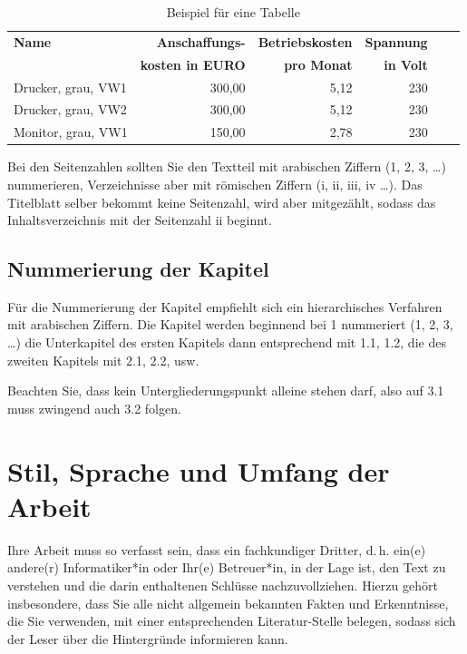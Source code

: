 \documentclass[a4paper,11pt,headings=normal]{scrartcl}
\begin{document}
\begin{table}
\caption{Beispiel für eine Tabelle}
\label{tabellenbeispiel}
\footnotesize
\centering
\begin{tabular}{l r r r r r}
\toprule
\textbf{Name} & \textbf{Anschaffungs-} & \textbf{Betriebskosten} & \textbf{Spannung}  \\
& \textbf{kosten in EURO} & \textbf{pro Monat} & \textbf{in Volt} \\
\midrule
Drucker, grau, VW1 &    300,00 &   5,12 & 230  \\
Drucker, grau, VW2 &    300,00 &   5,12 & 230  \\
Monitor, grau, VW1 &    150,00 &   2,78 & 230  \\
\bottomrule
\end{tabular}
\end{table}

Bei den Seitenzahlen sollten Sie den Textteil mit arabischen Ziffern (1, 2, 3, \dots) nummerieren, Verzeichnisse aber mit römischen Ziffern (i, ii, iii, iv \dots). Das Titelblatt selber bekommt keine Seitenzahl, wird aber mitgezählt, sodass das Inhaltsverzeichnis mit der Seitenzahl ii beginnt.

\subsection{Nummerierung der Kapitel}
Für die Nummerierung der Kapitel empfiehlt sich ein hierarchisches Verfahren mit arabischen Ziffern. Die Kapitel werden beginnend bei 1 nummeriert (1, 2, 3, \dots) die Unterkapitel des ersten Kapitels dann entsprechend mit 1.1, 1.2, die des zweiten Kapitels mit 2.1, 2.2, usw.

Beachten Sie, dass kein Untergliederungspunkt alleine stehen darf, also auf 3.1 muss zwingend auch 3.2 folgen.

\section{Stil, Sprache und Umfang der Arbeit}
Ihre Arbeit muss so verfasst sein, dass ein fachkundiger Dritter, d.\,h. ein(e) andere(r) Informatiker*in oder Ihr(e) Betreuer*in, in der Lage ist, den Text zu verstehen und die darin enthaltenen Schlüsse nachzuvollziehen. Hierzu gehört insbesondere, dass Sie alle nicht allgemein bekannten Fakten und Erkenntnisse, die Sie verwenden, mit einer entsprechenden Literatur-Stelle belegen, sodass sich der Leser über die Hintergründe informieren kann.
\end{document}
